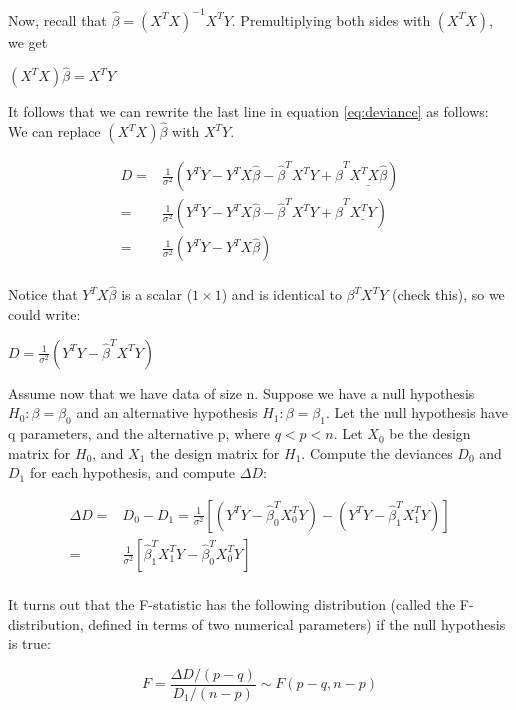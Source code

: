 \documentclass[
  12pt,
]{krantz}
\theoremstyle{definition}
\theoremstyle{definition}
\theoremstyle{definition}
\theoremstyle{definition}
\theoremstyle{remark}
\begin{document}
Now, recall that \(\hat \beta = (X^T X)^{-1} X^T Y\). Premultiplying both sides with \((X^T X)\), we get

\((X^T X)\hat \beta = X^T Y\)

It follows that we can rewrite the last line in equation \ref{eq:deviance} as follows: We can replace \((X^T X)\hat \beta\) with
\(X^T Y\).

\begin{equation}
\begin{split}
D =& \frac{1}{\sigma^2} (Y^T Y - Y^TX\hat \beta - \hat\beta^TX^T Y + \hat\beta^T \underline{X^T  X\hat \beta})\\
=& \frac{1}{\sigma^2} (Y^T Y - Y^TX\hat \beta - \hat\beta^TX^T Y + \hat\beta^T \underline{X^T Y})\\
=& \frac{1}{\sigma^2} (Y^T Y - Y^TX\hat \beta) \\
\end{split}
\end{equation}

Notice that \(Y^TX\hat \beta\) is a scalar (\(1\times 1\)) and is identical to \(\beta^TX^T Y\) (check this), so we could write:

\(D= \frac{1}{\sigma^2} (Y^T Y - \hat \beta^T X^T Y)\)

Assume now that we have data of size n.
Suppose we have a null hypothesis \(H_0: \beta=\beta_0\) and an alternative hypothesis \(H_1: \beta=\beta_{1}\). Let the null hypothesis have q parameters, and the alternative p, where \(q<p<n\).
Let \(X_0\) be the design matrix for \(H_0\), and \(X_1\) the design matrix for \(H_1\).
Compute the deviances \(D_0\) and \(D_1\) for each hypothesis, and compute \(\Delta D\):

\begin{equation}
\begin{split}
\Delta D =& D_0 - D_1 = \frac{1}{\sigma^2} [(Y^TY - \hat \beta_0^T X_0^T Y) -  (Y^TY - \hat \beta_1^T X_1^T Y)]\\
=& \frac{1}{\sigma^2} [\hat \beta_1^T X_1^T Y - \hat \beta_0^T X_0^T Y]\\
\end{split}
\end{equation}

It turns out that the F-statistic has the following distribution (called the F-distribution, defined in terms of two numerical parameters) if the null hypothesis is true:

\begin{equation}
F=\frac{\Delta D/(p-q)}{D_1/(n-p)} \sim F(p-q,n-p)
\end{equation}
\end{document}
